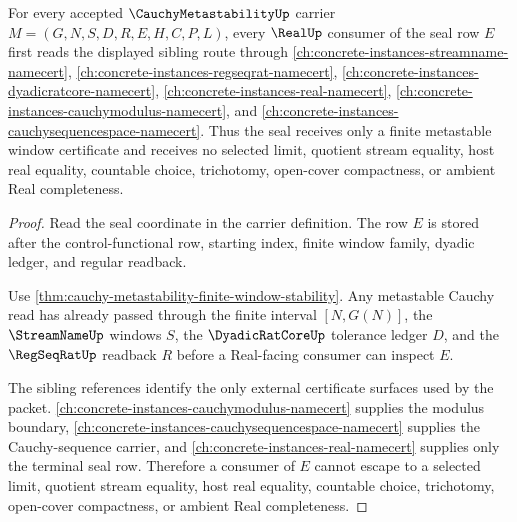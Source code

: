 \begin{theorem}
\label{thm:cauchy-metastability-real-seal-nonescape}
For every accepted $\CauchyMetastabilityUp$ carrier $M=(G,N,S,D,R,E,H,C,P,L)$, every $\RealUp$ consumer of the seal row $E$ first reads the displayed sibling route through \autoref{ch:concrete-instances-streamname-namecert}, \autoref{ch:concrete-instances-regseqrat-namecert}, \autoref{ch:concrete-instances-dyadicratcore-namecert}, \autoref{ch:concrete-instances-real-namecert}, \autoref{ch:concrete-instances-cauchymodulus-namecert}, and \autoref{ch:concrete-instances-cauchysequencespace-namecert}. Thus the seal receives only a finite metastable window certificate and receives no selected limit, quotient stream equality, host real equality, countable choice, trichotomy, open-cover compactness, or ambient Real completeness.
\end{theorem}
\begin{proof}
Read the seal coordinate in the carrier definition. The row $E$ is stored after the control-functional row, starting index, finite window family, dyadic ledger, and regular readback.

Use \autoref{thm:cauchy-metastability-finite-window-stability}. Any metastable Cauchy read has already passed through the finite interval $[N,G(N)]$, the $\StreamNameUp$ windows $S$, the $\DyadicRatCoreUp$ tolerance ledger $D$, and the $\RegSeqRatUp$ readback $R$ before a Real-facing consumer can inspect $E$.

The sibling references identify the only external certificate surfaces used by the packet. \autoref{ch:concrete-instances-cauchymodulus-namecert} supplies the modulus boundary, \autoref{ch:concrete-instances-cauchysequencespace-namecert} supplies the Cauchy-sequence carrier, and \autoref{ch:concrete-instances-real-namecert} supplies only the terminal seal row. Therefore a consumer of $E$ cannot escape to a selected limit, quotient stream equality, host real equality, countable choice, trichotomy, open-cover compactness, or ambient Real completeness.
\end{proof}


